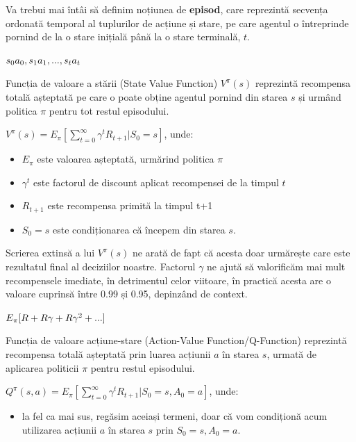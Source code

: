 Va trebui mai întâi să definim noțiunea de \textbf{episod}, care reprezintă secvența ordonată temporal al tuplurilor de acțiune și stare, pe care agentul o întreprinde pornind de la o stare inițială până la o stare terminală, $t$.
\begin{center}
    $s_0a_0, s_1a_1, \space ..., s_ta_t$
\end{center}

Funcția de valoare a stării (State Value Function) $V^\pi(s)$ reprezintă recompensa totală așteptată pe care o poate obține agentul pornind din starea $s$ și urmând politica $\pi$ pentru tot restul episodului.
\begin{center}
    $V^\pi(s) = E_\pi[\sum_{t=0}^\infty \gamma^t R_{t+1} | S_0 = s]$, unde:
\end{center}
\begin{itemize}
    \item \textbf{$E_\pi$} este valoarea așteptată, urmărind politica $\pi$
    \item \textbf{$\gamma ^ t$} este factorul de discount aplicat recompensei de la timpul $t$
    \item \textbf{$R_{t+1}$} este recompensa primită la timpul t+1
    \item \textbf{$S_0 = s$} este condiționarea că începem din starea $s$.
\end{itemize}

Scrierea extinsă a lui $V^\pi(s)$ ne arată de fapt că acesta doar urmărește care este rezultatul final al deciziilor noastre. Factorul $\gamma$ ne ajută să valorificăm mai mult recompensele imediate, în detrimentul celor viitoare, în practică acesta are o valoare cuprinsă între 0.99 și 0.95, depinzând de context.
\begin{center}
    $E_\pi[R + R\gamma + R\gamma^2 + \space ...]$
\end{center}

Funcția de valoare acțiune-stare (Action-Value Function/Q-Function) reprezintă recompensa totală așteptată prin luarea acțiunii $a$ în starea $s$, urmată de aplicarea politicii $\pi$ pentru restul episodului.
\begin{center}
    $Q^\pi(s,a) = E_\pi[\sum_{t=0}^\infty γ^t R_{t+1} | S_0 = s, A_0 = a]$, unde:
\end{center}
\begin{itemize}
    \item la fel ca mai sus, regăsim aceiași termeni, doar că vom condiționă acum utilizarea acțiunii $a$ în starea $s$ prin $S_0 = s, A_0 = a$.
\end{itemize}

